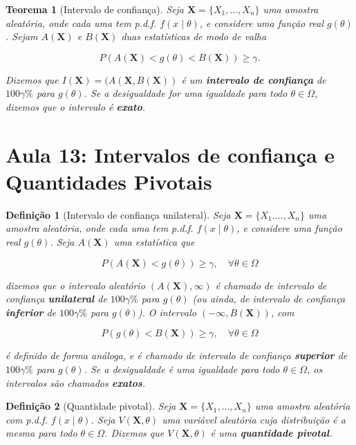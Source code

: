 \documentclass{article}
\newtheorem{theorem}{Teorema}
\newtheorem{definition}{Definição}
\begin{document}
	\begin{theorem}[Intervalo de confiança]
		Seja $\textbf{X} = \{ X_1, \ldots, X_n \}$ uma amostra aleatória, onde cada uma tem p.d.f. $f(x \mid \theta)$, e considere uma função real $g(\theta)$. Sejam $A(\textbf{X})$ e $B(\textbf{X})$ duas estatísticas de modo de valha
		
		\begin{equation}
			P(A(\textbf{X}) < g(\theta) < B(\textbf{X})) \geq \gamma.
		\end{equation}
		
		Dizemos que $I(\textbf{X}) = (A(\textbf{X},B(\textbf{X}))$ é um \textbf{intervalo de confiança} de $100 \gamma \%$ para $g(\theta)$. Se a desigualdade for uma igualdade para todo $\theta \in \Omega$, dizemos que o intervalo é \textbf{exato}.
	\end{theorem}
	
	\section*{Aula 13: Intervalos de confiança e Quantidades Pivotais}
	\label{s13}
	\begin{definition}[Intervalo de confiança unilateral]
		Seja $\textbf{X} = \{ X_1. \ldots, X_n \}$ uma amostra aleatória, onde cada uma tem p.d.f. $f(x \mid \theta)$, e considere uma função real $g(\theta)$. Seja $A( \textbf{X})$ uma estatística que
		
		$$P(A(\textbf{X}) < g(\theta)) \geq \gamma, \quad \forall \theta \in \Omega$$
		
		dizemos que o intervalo aleatório $( A(\textbf{X}), \infty)$ é chamado de intervalo de confiança \textbf{unilateral} de $100\gamma \%$ para $g(\theta)$ (ou ainda, de intervalo de confiança \textbf{inferior} de $100\gamma \%$ para $g(\theta)$). O intervalo $(-\infty, B(\textbf{X}))$, com
		
		$$P(g(\theta) < B(\textbf{X})) \geq \gamma, \quad \forall \theta \in \Omega$$
		
		é definido de forma análoga, e é chamado de intervalo de confiança \textbf{superior} de $100\gamma \%$ para $g(\theta)$. Se a desigualdade é uma igualdade para todo $\theta \in \Omega$, os intervalos são chamados \textbf{exatos}.
	\end{definition}
	
	\begin{definition}[Quantidade pivotal]
		Seja $\textbf{X} = \{ X_1, \ldots, X_n \}$ uma amostra aleatória com p.d.f. $f(x \mid \theta)$. Seja $V(\textbf{X}, \theta)$ uma variável aleatória cuja distribuição é a mesma para todo $\theta \in \Omega$. Dizemos que $V(\textbf{X}, \theta)$ é uma \textbf{quantidade pivotal}.
	\end{definition}
	
\end{document}
